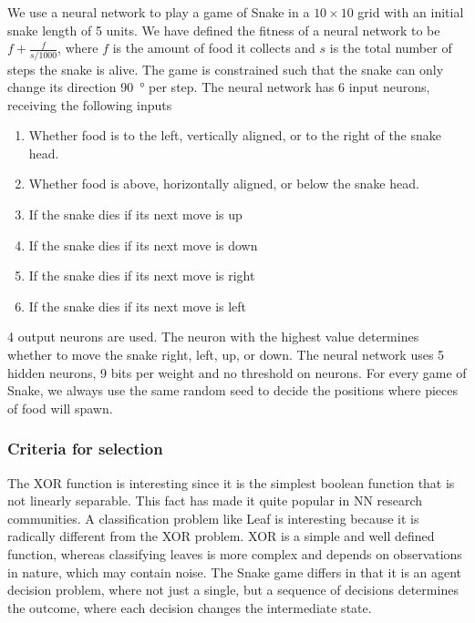 We use a neural network to play a game of Snake in a $10\times10$ grid with an initial snake length of 5 units.
We have defined the fitness of a neural network to be $f + \frac{f}{s/1000}$,
where $f$ is the amount of food it collects and $s$ is the total number of steps the snake is alive. The game is constrained such that the snake can only change its direction \SI{90}{\degree} per step. The neural network has 6 input neurons, receiving the following inputs 
\begin{enumerate}
  \item {} Whether food is to the left, vertically aligned, or to the right of the snake head.
  \item {} Whether food is above, horizontally aligned, or below the snake head.
  \item {} If the snake dies if its next move is up
  \item {} If the snake dies if its next move is down
  \item {} If the snake dies if its next move is right 
  \item {} If the snake dies if its next move is left
\end{enumerate}
4 output neurons are used. The neuron with the highest value determines whether to move the snake right, left, up, or down.
The neural network uses 5 hidden neurons, 9 bits per weight and no threshold on neurons.
For every game of Snake, we always use the same random seed to decide the positions where pieces of food will spawn.

\subsubsection{Criteria for selection}
The XOR function is interesting since it is the simplest boolean function that is not linearly separable.
This fact has made it quite popular in NN research communities\cite{masterThesisGANN}.
A classification problem like Leaf is interesting because it is radically different from the XOR problem.
XOR is a simple and well defined function, whereas classifying leaves is more complex and depends on observations in nature, which may contain noise.
The Snake game differs in that it is an agent decision problem, where not just a single, but a sequence of decisions determines the outcome, where each decision changes the intermediate state.
